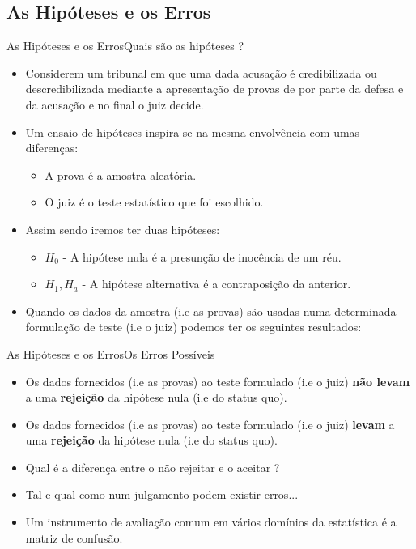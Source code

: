\documentclass[10,5pt, pdf]{beamer}
\begin{document}
\subsection{As Hipóteses e os Erros}\label{subsec:hiperros}
\begin{frame}{As Hipóteses e os Erros}{Quais são as hipóteses ?}
\begin{itemize}
    \item{Considerem um tribunal em que uma dada acusação é credibilizada ou descredibilizada mediante a apresentação de provas de por parte da defesa e da acusação e no final o juiz decide.}
    \pause
    \item{Um ensaio de hipóteses inspira-se na mesma envolvência com umas diferenças:}
    \pause
    \begin{itemize}
        \item{A prova é a amostra aleatória.}
        \pause
        \item{O juiz é o teste estatístico que foi escolhido.}
    \end{itemize}
    \pause
    \item{Assim sendo iremos ter duas hipóteses:}
    \begin{itemize}
        \pause
        \item{$H_0$ - A hipótese nula é a presunção de inocência de um réu.} 
        \pause
        \item{$H_1, H_a$ - A hipótese alternativa é a contraposição da anterior.} 
    \end{itemize}
    \pause
    \item{Quando os dados da amostra (i.e as provas) são usadas numa determinada formulação de teste (i.e o juiz) podemos ter os seguintes resultados:}
\end{itemize}
\end{frame}

\begin{frame}{As Hipóteses e os Erros}{Os Erros Possíveis}
\begin{itemize}
    \item{Os dados fornecidos (i.e as provas) ao teste formulado (i.e o juiz) \textbf{não levam} a uma \textbf{rejeição} da hipótese nula (i.e do status quo).} 
    \pause
    \item{Os dados fornecidos (i.e as provas) ao teste formulado (i.e o juiz) \textbf{levam} a uma \textbf{rejeição} da hipótese nula (i.e do status quo).} 
    \pause
    \item{Qual é a diferença entre o não rejeitar e o aceitar ?}
    \pause
    \item{Tal e qual como num julgamento podem existir erros...}
    \pause
    \item{Um instrumento de avaliação comum em vários domínios da estatística é a matriz de confusão.}
\end{itemize}
\end{frame}
\end{document}
